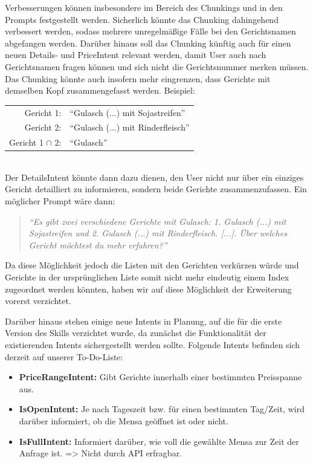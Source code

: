 \documentclass[12pt]{article}
\begin{document}
Verbesserungen können insbesondere im Bereich des Chunkings und in den Prompts festgestellt werden.
Sicherlich könnte das Chunking dahingehend verbessert werden, sodass mehrere unregelmäßige Fälle bei den Gerichtsnamen abgefangen werden.
Darüber hinaus soll das Chunking künftig auch für einen neuen Details- und PriceIntent relevant werden, damit User auch nach Gerichtsnamen fragen können und sich nicht die Gerichtsnummer merken müssen.
Das Chunking könnte auch insofern mehr eingrenzen, dass Gerichte mit demselben Kopf zusammengefasst werden. 
Beispiel:
\newline
~\\
\begin{tabular}{rl}
	Gericht 1:& “Gulasch (...) mit Sojastreifen” \\
	Gericht 2:& “Gulasch (...) mit Rinderfleisch” \\
	Gericht 1 $\cap$ 2:& “Gulasch” \\
\end{tabular}
~\\
\newline
Der DetailsIntent könnte dann dazu dienen, den User nicht nur über ein einziges Gericht detailliert zu informieren, sondern beide Gerichte zusammenzufassen.
Ein möglicher Prompt wäre dann: \begin{quote}\emph{“Es gibt zwei verschiedene Gerichte mit Gulasch: 1. Gulasch (...) mit Sojastreifen und 2. Gulasch (...) mit Rinderfleisch. [...]. Über welches Gericht möchtest du mehr erfahren?”}\end{quote}
Da diese Möglichkeit jedoch die Listen mit den Gerichten verkürzen würde und Gerichte in der ursprünglichen Liste somit nicht mehr eindeutig einem Index zugeordnet werden könnten, haben wir auf diese Möglichkeit der Erweiterung vorerst verzichtet.

Darüber hinaus stehen einige neue Intents in Planung, auf die für die erste Version des Skills verzichtet wurde, da zunächst die Funktionalität der existierenden Intents sichergestellt werden sollte.
Folgende Intents befinden sich derzeit auf unserer To-Do-Liste:

\begin{itemize}
\setlength\itemsep{0em}
	\item \textbf{PriceRangeIntent:} Gibt Gerichte innerhalb einer bestimmten Preisspanne aus.
	\item \textbf{IsOpenIntent:} Je nach Tageszeit bzw. für einen bestimmten Tag/Zeit, wird darüber informiert, ob die Mensa geöffnet ist oder nicht.
	\item \textbf{IsFullIntent:} Informiert darüber, wie voll die gewählte Mensa zur Zeit der Anfrage ist. => Nicht durch API erfragbar.
\end{itemize}
\end{document}
